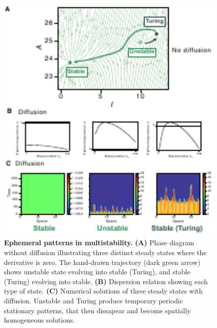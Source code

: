 \begin{figure}[H] %
    \centering
    \begin{adjustbox}{center}
        \includegraphics[width=1\textwidth]{chapters/Chapter 1/multistability2} %
    \end{adjustbox}
    \caption{\textbf{Ephemeral patterns in multistability.} \textbf{(A)} Phase diagram without diffusion illustrating three distinct steady states where the derivative is zero. The hand-drawn trajectory (dark green arrow) shows unstable state evolving into stable (Turing), and stable (Turing) evolving into stable. \textbf{(B)} Dispersion relation showing each type of state. \textbf{(C)} Numerical solutions of three steady states with diffusion. Unstable and Turing produce temporary periodic stationary patterns, that then dissapear and become spatially homogeneous solutions.}
    \label{fig:multistability2} %
\end{figure}

